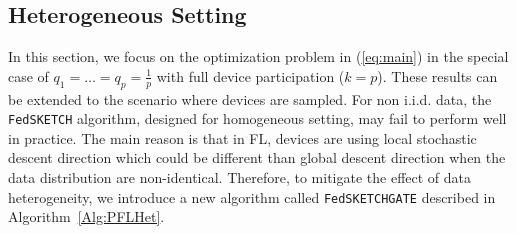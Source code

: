 \documentclass[twoside]{article}
\begin{document}
\subsection{Heterogeneous Setting}
\vspace{-0.05in}
In this section, we focus on the optimization problem in (\ref{eq:main}) in the special case of $q_1=\ldots=q_p=\frac{1}{p}$ with full device participation ($k=p$). 
These results can be extended to the scenario where devices are sampled.
For non i.i.d. data, the \texttt{FedSKETCH} algorithm, designed for homogeneous setting, may fail to perform well in practice. 
The main reason is that in FL, devices are using local stochastic descent direction which could be different than global descent direction when the data distribution are non-identical. 
Therefore, to mitigate the effect of data heterogeneity, we introduce a new algorithm called \texttt{FedSKETCHGATE} described in Algorithm~\ref{Alg:PFLHet}. 
\end{document}
